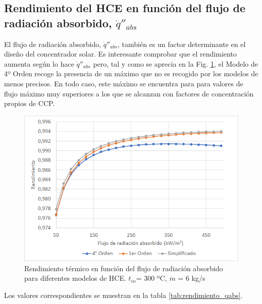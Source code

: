 \subsection{Rendimiento del HCE en función del flujo de radiación absorbido, $\dot q''_{abs}$}

El flujo de radiación absorbido, $\dot q''_{abs}$,  también es un factor determinante en el diseño del concentrador solar. Es interesante comprobar que el rendimiento aumenta según lo hace $\dot q''_{abs}$ pero, tal y como se aprecia en la Fig. \ref{fig:rendimiento_qabs}, el Modelo de 4º Orden recoge la presencia de un máximo que no es recogido por los modelos de menos precisos.  En todo caso, este máximo se encuentra para para valores de flujo máximo muy superiores a los que se alcanzan con factores de concentración propios de CCP.

\begin{figure}[H]
\includegraphics[width=0.9\linewidth]{images/rendimiento_qabs.png}
\caption[Rendimiento térmico en función del flujo de radiación absorbido para diferentes modelos de HCE]{Rendimiento térmico en función del flujo de radiación absorbido para diferentes modelos de HCE. $t_{in}$= 300 ºC, $\dot m$ = 6 kg/s} 
\label{fig:rendimiento_qabs}
\end{figure}

Los valores correspondientes se muestran en la tabla \ref{tab:rendimiento_qabs}.

